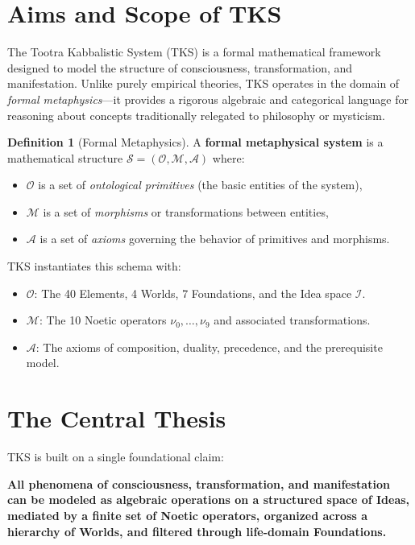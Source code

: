 \documentclass[11pt,twoside,openright]{book}
\theoremstyle{definition}
\newtheorem{definition}{Definition}[chapter]
\theoremstyle{plain}
\theoremstyle{remark}
\newcommand{\Ideas}{\mathcal{I}}
\newcommand{\noe}[1]{\nu_{#1}}
\begin{document}
\section{Aims and Scope of TKS}

The Tootra Kabbalistic System (TKS) is a formal mathematical framework designed to model the structure of consciousness, transformation, and manifestation. Unlike purely empirical theories, TKS operates in the domain of \emph{formal metaphysics}---it provides a rigorous algebraic and categorical language for reasoning about concepts traditionally relegated to philosophy or mysticism.

\begin{definition}[Formal Metaphysics]
\label{def:formal-metaphysics}
A \textbf{formal metaphysical system} is a mathematical structure $\mathcal{S} = (\mathcal{O}, \mathcal{M}, \mathcal{A})$ where:
\begin{itemize}
  \item $\mathcal{O}$ is a set of \emph{ontological primitives} (the basic entities of the system),
  \item $\mathcal{M}$ is a set of \emph{morphisms} or transformations between entities,
  \item $\mathcal{A}$ is a set of \emph{axioms} governing the behavior of primitives and morphisms.
\end{itemize}
\end{definition}

TKS instantiates this schema with:
\begin{itemize}
  \item $\mathcal{O}$: The 40 Elements, 4 Worlds, 7 Foundations, and the Idea space $\Ideas$.
  \item $\mathcal{M}$: The 10 Noetic operators $\noe{0}, \ldots, \noe{9}$ and associated transformations.
  \item $\mathcal{A}$: The axioms of composition, duality, precedence, and the prerequisite model.
\end{itemize}

\section{The Central Thesis}

TKS is built on a single foundational claim:

\begin{tcolorbox}[colback=blue!5!white,colframe=blue!75!black,title=Central Thesis of TKS]
\textbf{All phenomena of consciousness, transformation, and manifestation can be modeled as algebraic operations on a structured space of Ideas, mediated by a finite set of Noetic operators, organized across a hierarchy of Worlds, and filtered through life-domain Foundations.}
\end{tcolorbox}
\end{document}
